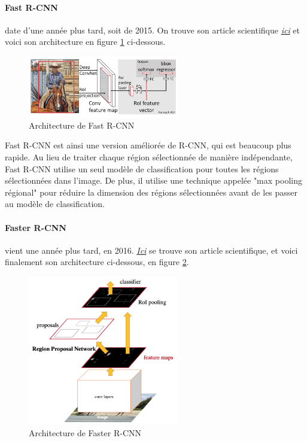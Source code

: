 
\paragraph{Fast R-CNN} date d'une année plus tard, soit de 2015. On trouve son article scientifique \href{https://arxiv.org/pdf/1504.08083.pdf}{\textit{ici}} et voici son architecture en figure \ref{fig:fastRcnn_architecture} ci-dessous.

\begin{figure}[H]
    \centering
    \includegraphics[width=250px]{images/model_fastRcnn_architecture.png}
    \caption{Architecture de Fast R-CNN}
    \label{fig:fastRcnn_architecture}
\end{figure}

Fast R-CNN est ainsi une version améliorée de R-CNN, qui est beaucoup plus rapide. Au lieu de traiter chaque région sélectionnée de manière indépendante, Fast R-CNN utilise un seul modèle de classification pour toutes les régions sélectionnées dans l'image. De plus, il utilise une technique appelée "max pooling régional" pour réduire la dimension des régions sélectionnées avant de les passer au modèle de classification.


\paragraph{Faster R-CNN} vient une année plus tard, en 2016.  \href{https://arxiv.org/pdf/1506.01497.pdf}{\textit{Ici}} se trouve son article scientifique, et voici finalement son architecture ci-dessous, en figure \ref{fig:fasterRcnn_architecture}.

\begin{figure}[H]
    \centering
    \includegraphics[width=250px]{images/model_fasterRcnn_architecture.png}
    \caption{Architecture de Faster R-CNN}
    \label{fig:fasterRcnn_architecture}
\end{figure}

